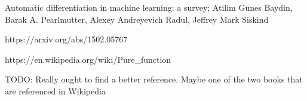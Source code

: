 \documentclass[12pt]{article}
\begin{document}
\begin{thebibliography}{9}

  Automatic differentiation in machine learning: a survey;
  Atilim Gunes Baydin, Barak A. Pearlmutter, Alexey Andreyevich Radul, Jeffrey Mark Siskind
  
https://arxiv.org/abs/1502.05767
  
  https://en.wikipedia.org/wiki/Pure\_function

  TODO: Really ought to find a better reference.  Maybe one of the two
  books that are referenced in Wikipedia

\end{thebibliography}
\end{document}
